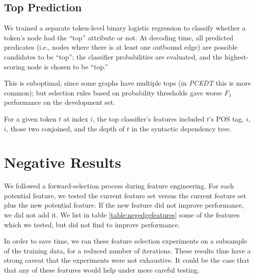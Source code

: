 \documentclass[11pt]{article}
\newcommand{\bocomment}[1]{\textcolor{Bittersweet}{[#1 -BTO]}}
\newcommand{\jmf}[1]{\textcolor{orange}{[#1 -JMF]}}
\renewcommand{\bocomment}[1]{}
\renewcommand{\jmf}[1]{}
\newcommand{\codenote}[1]{}
\begin{document}
\subsection{Top Prediction} \label{s:top_model}

\bocomment{may15 afternoon: The below describes how top pred works in LogitEdge.  Jeff, please confirm this is how you use the topness classifier, or modify appropriately.}\jmf{yes, this is correct for the graph parser}

We trained a separate token-level binary logistic regression to classify
whether a token's node had the ``top'' attribute or not.
At decoding time, all predicted predicates (i.e., nodes where there is at least one outbound edge)
are possible candidates to be ``top'';
the classifier probabilities are evaluated, and the highest-scoring node is
chosen to be ``top.''
\codenote{LogitEdge: MyGraph::decideTops()}
This is suboptimal, since some graphs have multiple tops (in \emph{PCEDT} this is
more common);
but selection rules based on probability thresholds gave worse $F_1$
performance on the development set. \codenote{\url{https://github.com/Noahs-ARK/semeval-2014/issues/37}}

For a given token $t$ at index $i$, the top classifier's features
included $t$'s POS tag, $i$, $i$, those two conjoined, and the depth
of $t$ in the syntactic dependency tree.


\section{Negative Results}
\label{s:badfeatures}

We followed a forward-selection process during feature engineering.
For each potential feature, we tested the current feature set versus the current
feature set plus the new potential feature.
If the new feature did not improve performance, we did not add it.
We list in table \ref{table:negedgefeatures} some of the features which we tested, but did not find to improve
performance.

In order to save time, we ran these feature selection experiments
on a subsample of the training data, for a reduced number of iterations.
These results thus have a 
 strong caveat that the experiments were
not exhaustive.  It could be the case that that any of these features would help under more careful testing.
\end{document}
